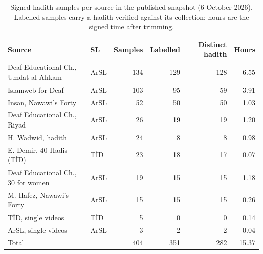 \begin{table}[ht]
\centering
\small
\caption{Signed hadith samples per source in the published snapshot (6 October 2026). Labelled samples carry a hadith verified against its collection; hours are the signed time after trimming.}
\label{tab:hadith_sources}
\begin{tabular}{llrrrr}
\toprule
Source & SL & Samples & Labelled & Distinct hadith & Hours \\
\midrule
Deaf Educational Ch., Umdat al-Ahkam & ArSL & 134 & 129 & 128 & 6.55 \\
Islamweb for Deaf & ArSL & 103 & 95 & 59 & 3.91 \\
Insan, Nawawi's Forty & ArSL & 52 & 50 & 50 & 1.03 \\
Deaf Educational Ch., Riyad & ArSL & 26 & 19 & 19 & 1.20 \\
H. Wadwid, hadith & ArSL & 24 & 8 & 8 & 0.98 \\
E. Demir, 40 Hadis (TİD) & TİD & 23 & 18 & 17 & 0.07 \\
Deaf Educational Ch., 30 for women & ArSL & 19 & 15 & 15 & 1.18 \\
M. Hafez, Nawawi's Forty & ArSL & 15 & 15 & 15 & 0.26 \\
TİD, single videos & TİD & 5 & 0 & 0 & 0.14 \\
ArSL, single videos & ArSL & 3 & 2 & 2 & 0.04 \\
\midrule
Total & & 404 & 351 & 282 & 15.37 \\
\bottomrule
\end{tabular}
\end{table}
